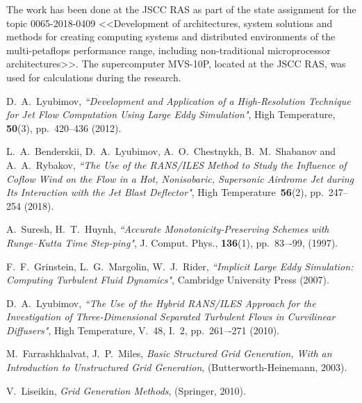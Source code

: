 \documentclass[
11pt,%
tightenlines,%
twoside,%
onecolumn,%
nofloats,%
nobibnotes,%
nofootinbib,%
superscriptaddress,%
noshowpacs,%
centertags]%
{revtex4}
\begin{document}
\begin{acknowledgments}
The work has been done at the JSCC RAS as part of the state assignment for the topic 0065-2018-0409 <<Development of architectures, system solutions and methods for creating computing systems and distributed environments of the multi-petaflops performance range, including non-traditional microprocessor architectures>>. The supercomputer MVS-10P, located at the JSCC RAS, was used for calculations during the research.
\end{acknowledgments}

\begin{thebibliography}{99}


D.~A.~Lyubimov, {\it ``Development and Application of a High-Resolution Technique for Jet Flow Computation Using Large Eddy Simulation"}, High Temperature, {\bf 50}(3), pp.~420--436 (2012).

L.~A.~Benderskii, D.~A.~Lyubimov, A.~O.~Chestnykh, B.~M.~Shabanov and A.~A.~Rybakov, {\it ``The Use of the RANS/ILES Method to Study the Influence of Coflow Wind on the Flow in a Hot, Nonisobaric, Supersonic Airdrome Jet during Its Interaction with the Jet Blast Deflector"}, High Temperature~{\bf 56}(2), pp.~247--254 (2018).

A.~Suresh, H.~T.~Huynh, {\it ``Accurate Monotonicity-Preserving Schemes with Runge–Kutta Time Step-ping"}, J. Comput. Phys., {\bf 136}(1), pp.~83–-99, (1997).

F.~F.~Grinstein, L.~G.~Margolin, W.~J.~Rider, {\it ``Implicit Large Eddy Simulation: Computing Turbulent Fluid Dynamics"}, Cambridge University Press (2007).


D.~A.~Lyubimov, {\it ``The Use of the Hybrid RANS/ILES Approach for the Investigation of Three-Dimensional Separated Turbulent Flows in Curvilinear Diffusers"}, High Temperature, V.~48, I.~2, pp.~261–-271 (2010).


M.~Farrashkhalvat, J.~P.~Miles, \emph{Basic Structured Grid Generation, With an Introduction to Unstructured Grid Generation}, (Butterworth-Heinemann, 2003).

V.~Liseikin, \emph{Grid Generation Methods}, (Springer, 2010).


\end{thebibliography}
\end{document}
